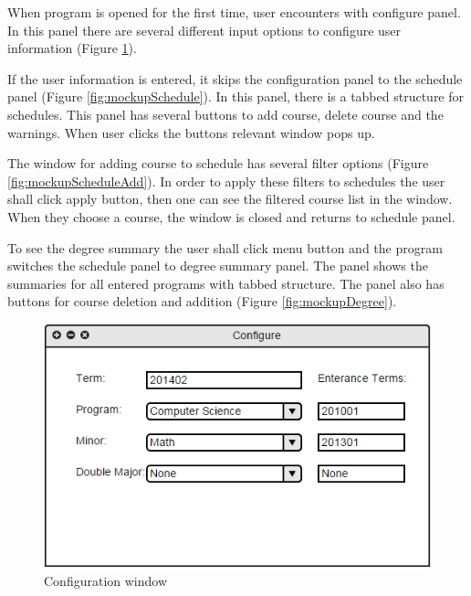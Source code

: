 \documentclass[twoside,letterpaper]{article}
\begin{document}
{\color{black}
When program is opened for the first time, user encounters with configure panel. In this panel there are several different input options to configure user information (Figure \ref{fig:mockupConfig}).

\smallskip

If the user information is entered, it skips the configuration panel to the schedule panel (Figure \ref{fig:mockupSchedule}). In this panel, there is a tabbed structure for schedules. This panel has several buttons to add course, delete course and the warnings. When user clicks the buttons relevant window pops up.

\smallskip

The window for adding course to schedule has several filter options (Figure \ref{fig:mockupScheduleAdd}). In order to apply these filters to schedules the user shall click apply button, then one can see the filtered course list in the window. When they choose a course, the window is closed and returns to schedule panel.

\smallskip

To see the degree summary the user shall click menu button and the program switches the schedule panel to degree summary panel. The panel shows the summaries for all entered programs with tabbed structure. The panel also has buttons for course deletion and addition (Figure \ref{fig:mockupDegree}).}

\begin{figure}[h!]
\centering
\includegraphics[keepaspectratio, scale=0.6]{Mockups/config.png}
\caption{Configuration window}
\label{fig:mockupConfig}
\end{figure}
\end{document}

